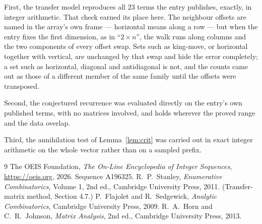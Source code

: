 \documentclass[11pt,a4paper]{article}
\theoremstyle{plain}
\theoremstyle{definition}
\begin{document}
First, the transfer model reproduces all $23$ terms the entry publishes, exactly, in
integer arithmetic. That check earned its place here. The neighbour offsets are named in the
array's own frame --- horizontal means along a row --- but when the entry fixes the first
dimension, as in ``$2\times n$'', the walk runs along columns and the two components of every
offset swap. Sets such as king-move, or horizontal together with vertical, are unchanged by
that swap and hide the error completely; a set such as horizontal, diagonal and antidiagonal
is not, and the counts came out as those of a different member of the same family until the
offsets were transposed.

Second, the conjectured recurrence was evaluated directly on the entry's own published terms,
with no matrices involved, and holds wherever the proved range and the data overlap.

Third, the annihilation test of Lemma~\ref{lem:crit} was carried out in exact integer
arithmetic on the whole vector rather than on a sampled prefix.

\begin{thebibliography}{9}
 The OEIS Foundation, \emph{The On-Line Encyclopedia of Integer
Sequences}, \url{https://oeis.org}, 2026. Sequence A196325.
 R.~P.~Stanley, \emph{Enumerative Combinatorics}, Volume 1, 2nd ed.,
Cambridge University Press, 2011. (Transfer-matrix method, Section 4.7.)
 P.~Flajolet and R.~Sedgewick, \emph{Analytic Combinatorics}, Cambridge
University Press, 2009.
 R.~A.~Horn and C.~R.~Johnson, \emph{Matrix Analysis}, 2nd ed., Cambridge
University Press, 2013.
\end{thebibliography}
\end{document}

